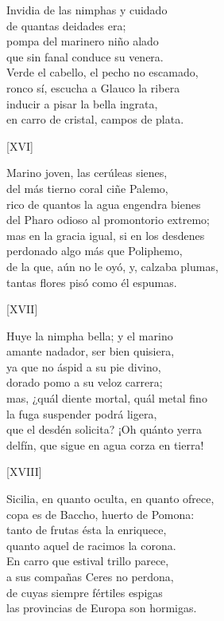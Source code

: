 \documentclass[11pt,a4paper,twoside]{article}
\begin{document}
Invidia de las nimphas y cuidado\\
de quantas  deidades era;\\
pompa del marinero niño alado\\
que sin fanal conduce su venera.\\
Verde el cabello, el pecho no escamado,\\
ronco sí, escucha a Glauco la ribera\\
inducir a pisar la bella ingrata,\\
en carro de cristal, campos de plata.\par\pend
\relax
\vfill
\newpage
%
\begin{center}
	[XVI]
\end{center}\pstart
Marino joven, las cerúleas sienes,\\
del más tierno coral ciñe Palemo,\\
rico de quantos la agua engendra bienes\\
del Pharo odioso al promontorio extremo;\\
mas en la gracia igual, si en los desdenes\\
perdonado algo más que Poliphemo,\\
de la que, aún no le oyó, y, calzaba plumas,\\
tantas flores pisó como él espumas.\par\pend
%
\begin{center}
	[XVII]
\end{center}\pstart
Huye la nimpha bella; y el marino\\
amante nadador, ser bien quisiera,\\
ya que no áspid a su pie divino,\\
dorado pomo a su veloz carrera;\\
mas, ¿quál diente mortal, quál metal fino\\
la fuga suspender podrá ligera,\\
que el desdén solicita? ¡Oh quánto yerra\\
delfín, que sigue en agua corza en tierra!\par\pend
%
\begin{center}
	[XVIII]
\end{center}\pstart
Sicilia, en quanto oculta, en quanto ofrece,\\
copa es de Baccho, huerto de Pomona:\\
tanto de frutas ésta la enriquece,\\
quanto aquel de racimos la corona.\\
En carro que estival trillo parece,\\
a sus compañas Ceres no perdona,\\
de cuyas siempre fértiles espigas\\
las provincias de Europa son hormigas.\par\pend
\end{document}
